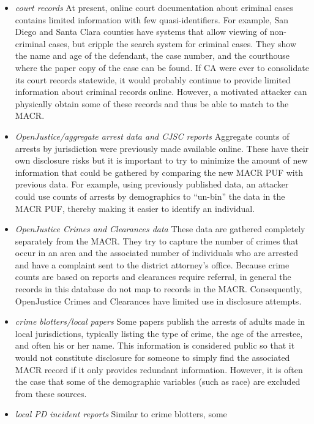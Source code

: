 \documentclass[]{article}
\providecommand{\tightlist}{%
  \setlength{\itemsep}{0pt}\setlength{\parskip}{0pt}}
\begin{document}
\begin{itemize}
\tightlist
\item
  \emph{court records} At present, online court documentation about
  criminal cases contains limited information with few
  quasi-identifiers. For example, San Diego and Santa Clara counties
  have systems that allow viewing of non-criminal cases, but cripple the
  search system for criminal cases. They show the name and age of the
  defendant, the case number, and the courthouse where the paper copy of
  the case can be found. If CA were ever to consolidate its court
  records statewide, it would probably continue to provide limited
  information about criminal records online. However, a motivated
  attacker can physically obtain some of these records and thus be able
  to match to the MACR.
\item
  \emph{OpenJustice/aggregate arrest data and CJSC reports} Aggregate
  counts of arrests by jurisdiction were previously made available
  online. These have their own disclosure risks but it is important to
  try to minimize the amount of new information that could be gathered
  by comparing the new MACR PUF with previous data. For example, using
  previously published data, an attacker could use counts of arrests by
  demographics to ``un-bin'' the data in the MACR PUF, thereby making it
  easier to identify an individual.
\item
  \emph{OpenJustice Crimes and Clearances data} These data are gathered
  completely separately from the MACR. They try to capture the number of
  crimes that occur in an area and the associated number of individuals
  who are arrested and have a complaint sent to the district attorney's
  office. Because crime counts are based on reports and clearances
  require referral, in general the records in this database do not map
  to records in the MACR. Consequently, OpenJustice Crimes and
  Clearances have limited use in disclosure attempts.
\item
  \emph{crime blotters/local papers} Some papers publish the arrests of
  adults made in local jurisdictions, typically listing the type of
  crime, the age of the arrestee, and often his or her name. This
  information is considered public so that it would not constitute
  disclosure for someone to simply find the associated MACR record if it
  only provides redundant information. However, it is often the case
  that some of the demographic variables (such as race) are excluded
  from these sources.
\item
  \emph{local PD incident reports} Similar to crime blotters, some

\end{itemize}
\end{document}
